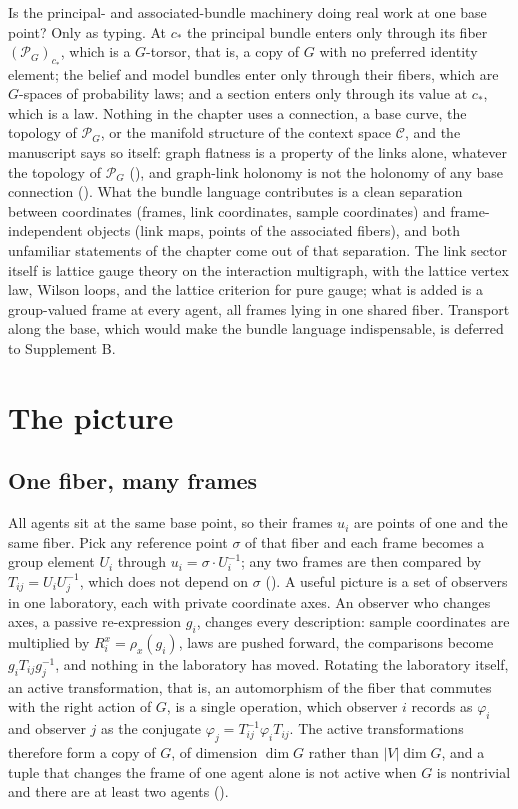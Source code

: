 Is the principal- and associated-bundle machinery doing real work at one base point? Only as typing. At
$c_*$ the principal bundle enters only through its fiber $(\mathscr P_G)_{c_*}$, which is a $G$-torsor,
that is, a copy of $G$ with no preferred identity element; the belief and model bundles enter only through
their fibers, which are $G$-spaces of probability laws; and a section enters only through its value at
$c_*$, which is a law. Nothing in the chapter uses a connection, a base curve, the topology of
$\mathscr P_G$, or the manifold structure of the context space $\mathcal C$, and the manuscript says so
itself: graph flatness is a property of the links alone, whatever the topology of $\mathscr P_G$
(), and graph-link holonomy is not the holonomy of any base connection
(). What the bundle language contributes is a clean separation between coordinates
(frames, link coordinates, sample coordinates) and frame-independent objects (link maps, points of the
associated fibers), and both unfamiliar statements of the chapter come out of that separation. The link sector
itself is lattice gauge theory on the interaction multigraph, with the lattice vertex law, Wilson loops, and the
lattice criterion for pure gauge; what is added is a group-valued frame at every agent, all frames lying in one
shared fiber. Transport along the base, which would make the bundle language indispensable, is deferred to
Supplement B.

\section{The picture}
\label{comp:ch02-picture}

\subsection{One fiber, many frames}

All agents sit at the same base point, so their frames $u_i$ are points of one and the same fiber. Pick any
reference point $\sigma$ of that fiber and each frame becomes a group element $U_i$ through
$u_i=\sigma\cdot U_i^{-1}$; any two frames are then compared by $T_{ij}=U_iU_j^{-1}$, which does not depend
on $\sigma$ (). A useful picture is a set of observers in one laboratory,
each with private coordinate axes. An observer who changes axes, a passive re-expression $g_i$, changes
every description: sample coordinates are multiplied by $R_i^x=\rho_x(g_i)$, laws are pushed forward, the
comparisons become $g_iT_{ij}g_j^{-1}$, and nothing in the laboratory has moved. Rotating the laboratory
itself, an active transformation, that is, an automorphism of the fiber that commutes with the right action
of $G$, is a single operation, which observer $i$ records as $\varphi_i$ and observer $j$ as the conjugate
$\varphi_j=T_{ij}^{-1}\varphi_iT_{ij}$. The active transformations therefore form a copy of $G$, of
dimension $\dim G$ rather than $|V|\dim G$, and a tuple that changes the frame of one agent alone is not
active when $G$ is nontrivial and there are at least two agents ().

